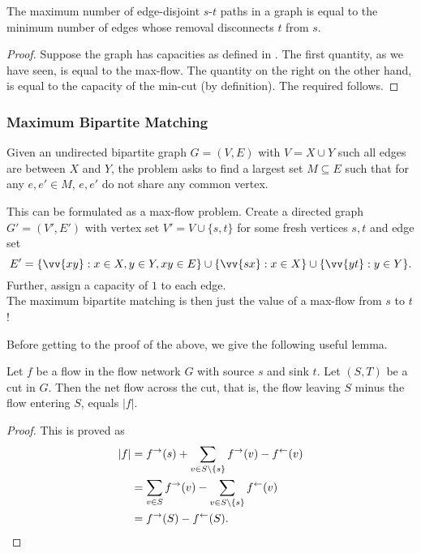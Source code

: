 \begin{theorem}
	The maximum number of edge-disjoint $s$-$t$ paths in a graph is equal to the minimum number of edges whose removal disconnects $t$ from $s$.
\end{theorem}
\begin{proof}
	Suppose the graph has capacities as defined in . The first quantity, as we have seen, is equal to the max-flow. The quantity on the right on the other hand, is equal to the capacity of the min-cut (by definition). The required follows.
\end{proof}

\subsubsection{Maximum Bipartite Matching}

Given an undirected bipartite graph $G=(V,E)$ with $V=X\cup Y$ such all edges are between $X$ and $Y$, the problem asks to find a largest set $M\subseteq E$ such that for any $e,e'\in M$, $e,e'$ do not share any common vertex.

This can be formulated as a max-flow problem. Create a directed graph $G' = (V',E')$ with vertex set $V' = V\cup\{s,t\}$ for some fresh vertices $s,t$ and edge set
\[ E' = \{\vv{xy}: x\in X, y\in Y, xy\in E\} \cup \{\vv{sx} : x\in X\} \cup \{\vv{yt} : y\in Y\}. \]
Further, assign a capacity of $1$ to each edge.\\
The maximum bipartite matching is then just the value of a max-flow from $s$ to $t$!

Before getting to the proof of the above, we give the following useful lemma.

\begin{lemma}
	\label{lem: max bi match}
	Let $f$ be a flow in the flow network $G$ with source $s$ and sink $t$. Let $(S,T)$ be a cut in $G$. Then the net flow across the cut, that is, the flow leaving $S$ minus the flow entering $S$, equals $|f|$.
\end{lemma}
\begin{proof}
	This is proved as
	\begin{align*}
		|f| &= f^\to(s) + \sum_{v\in S\setminus\{s\}} f^\to(v) - f^\leftarrow(v) \\
			&= \sum_{v\in S} f^\to(v) - \sum_{v\in S\setminus\{s\}} f^\leftarrow(v) \\
			&= f^\to(S) - f^\leftarrow(S).
	\end{align*}
\end{proof}

